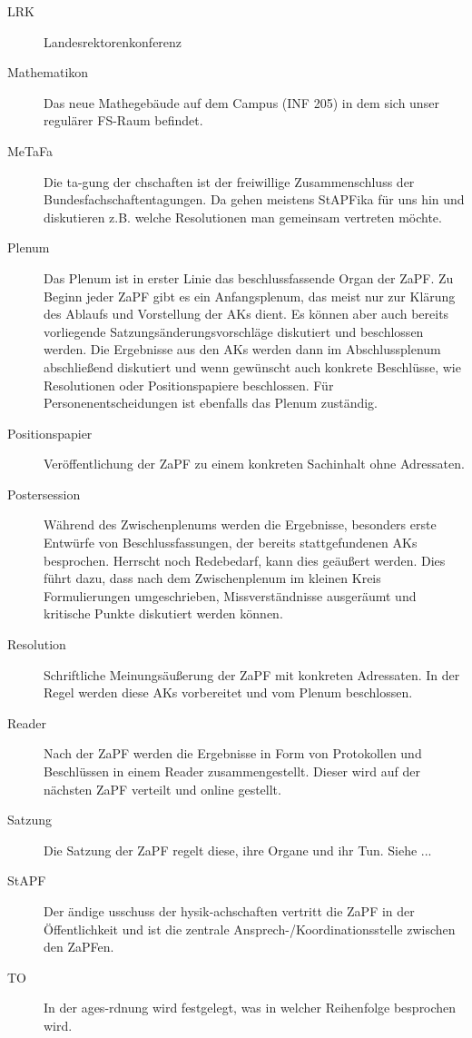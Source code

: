 \begin{description}
	\item[LRK] Landesrektorenkonferenz
	\item[Mathematikon] Das neue Mathegebäude auf dem Campus (INF 205) in dem sich unser regulärer FS-Raum befindet.
	\item[MeTaFa] Die ta-gung der chschaften ist der freiwillige Zusammenschluss der Bundesfachschaftentagungen. Da gehen meistens StAPFika für uns hin und diskutieren z.B. welche Resolutionen man gemeinsam vertreten möchte.
	\item[Plenum] Das Plenum ist in erster Linie das beschlussfassende Organ der ZaPF. Zu Beginn jeder ZaPF gibt es ein Anfangsplenum, das meist nur zur Klärung des Ablaufs und Vorstellung der AKs dient. Es können aber auch bereits vorliegende Satzungsänderungsvorschläge diskutiert und beschlossen werden. Die Ergebnisse aus den AKs werden dann im Abschlussplenum abschließend diskutiert und wenn gewünscht auch konkrete Beschlüsse, wie Resolutionen oder Positionspapiere beschlossen. Für Personenentscheidungen ist ebenfalls das Plenum zuständig.
	\item[Positionspapier] Veröffentlichung der ZaPF zu einem konkreten Sachinhalt ohne Adressaten.  
	\item[Postersession] Während des Zwischenplenums werden die Ergebnisse, besonders erste Entwürfe von Beschlussfassungen, der bereits stattgefundenen AKs besprochen. Herrscht noch Redebedarf, kann dies geäußert werden. Dies führt dazu, dass nach dem Zwischenplenum im kleinen Kreis Formulierungen umgeschrieben, Missverständnisse ausgeräumt und kritische Punkte diskutiert werden können. 
	\item[Resolution] Schriftliche Meinungsäußerung der ZaPF mit konkreten Adressaten. In der Regel werden diese AKs vorbereitet und vom Plenum beschlossen.
	\item[Reader] Nach der ZaPF werden die Ergebnisse in Form von Protokollen und Beschlüssen in einem Reader zusammengestellt. Dieser wird auf der nächsten ZaPF verteilt und online gestellt. 
	\item[Satzung] Die Satzung der ZaPF regelt diese, ihre Organe und ihr Tun. Siehe ...
	\item[StAPF] Der ändige usschuss der hysik-achschaften vertritt die ZaPF in der Öffentlichkeit und ist die zentrale Ansprech-/Koordinationsstelle zwischen den ZaPFen.
	\item[TO] In der ages-rdnung wird festgelegt, was in welcher Reihenfolge besprochen wird.

\end{description}
